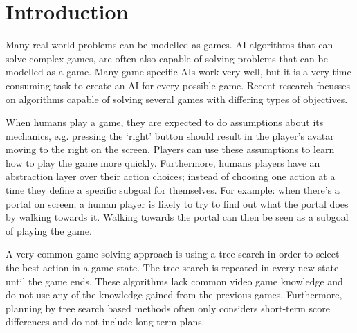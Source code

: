 \section{Introduction}
\label{sec:introduction}
%

Many real-world problems can be modelled as games. AI algorithms that can solve
complex games, are often also capable of solving problems that can be modelled
as a game. Many game-specific AIs work very well, but it is a very time
consuming task to create an AI for every possible game. Recent research
focusses on algorithms capable of solving several games with differing types of
objectives. 


When humans play a game, they are expected to do assumptions about
its mechanics, e.g. pressing the `right' button should result in the player's
avatar moving to the right on the screen. Players can use these assumptions to
learn how to play the game more quickly. Furthermore, humans players 
have an abstraction layer over their action choices; instead of
choosing one action at a time they define a specific subgoal for themselves. 
For example: when there's a portal on screen, a human player is
likely to try to find out what the portal does by walking towards it. Walking
towards the portal can then be seen as a subgoal of playing the game.

A very common game solving approach is using a tree search in order to select
the best action in a game state. The tree search is repeated in every new state
until the game ends. These algorithms lack common video game knowledge and do
not use any of the knowledge gained from the previous games.
Furthermore, planning by tree search based methods often only considers
short-term score differences and do not include long-term plans. 


